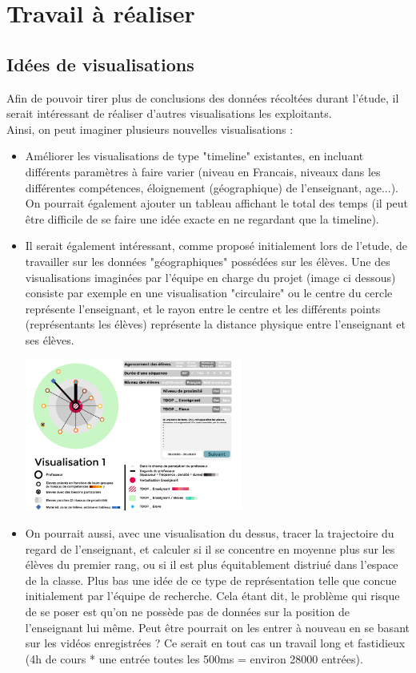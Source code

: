 \documentclass{article}
\begin{document}
\section{Travail à réaliser}
\subsection{Idées de visualisations}
Afin de pouvoir tirer plus de conclusions des données récoltées durant l'étude, il serait intéressant de réaliser d'autres visualisations les exploitants.\\
Ainsi, on peut imaginer plusieurs nouvelles visualisations :
\begin{itemize}
  \item Améliorer les visualisations de type "timeline" existantes, en incluant différents paramètres à faire varier (niveau en Francais, niveaux dans les différentes compétences, éloignement (géographique) de l'enseignant, age...). On pourrait également ajouter un tableau affichant le total des temps (il peut être difficile de se faire une idée exacte en ne regardant que la timeline).
  \item Il serait également intéressant, comme proposé initialement lors de l'etude, de travailler sur les données "géographiques" possédées sur les élèves. Une des visualisations imaginées par l'équipe en charge du projet (image ci dessous) consiste par exemple en une visualisation "circulaire" ou le centre du cercle représente l'enseignant, et le rayon entre le centre et les différents points (représentants les élèves) représente la distance physique entre l'enseignant et ses élèves.\\
    \begin{center}
      \includegraphics[height=5cm]{visu_cercle.png}
    \end{center}
  \item On pourrait aussi, avec une visualisation du dessus, tracer la trajectoire du regard de l'enseignant, et calculer si il se concentre en moyenne plus sur les élèves du premier rang, ou si il est plus équitablement distriué dans l'espace de la classe. Plus bas une idée de ce type de représentation telle que concue initialement par l'équipe de recherche. Cela étant dit, le problème qui risque de se poser est qu'on ne possède pas de données sur la position de l'enseignant lui même. Peut être pourrait on les entrer à nouveau en se basant sur les vidéos enregistrées ? Ce serait en tout cas un travail long et fastidieux (4h de cours * une entrée toutes les 500ms = environ 28000 entrées).\\

\end{itemize}
\end{document}
